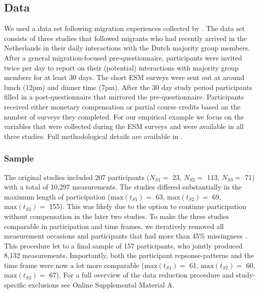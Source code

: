 \subsection{Data}

We used a data set following migration experiences collected by
\citet[][]{Kreienkamp2022b}. The data set consists of three studies that
followed migrants who had recently arrived in the Netherlands in their
daily interactions with the Dutch majority group members. After a
general migration-focused pre-questionnaire, participants were invited
twice per day to report on their (potential) interactions with majority
group members for at least 30 days. The short ESM surveys were sent out
at around lunch (12pm) and dinner time (7pm). After the 30 day study
period participants filled in a post-questionnaire that mirrored the
pre-questionnaire. Participants received either monetary compensation or
partial course credits based on the number of surveys they completed.
For our empirical example we focus on the variables that were collected
during the ESM surveys and were available in all three studies. Full
methodological details are available in \citet[][]{Kreienkamp2022b}.

\subsubsection{Sample}

The original studies included 207 participants (\(N_{S1}=\) 23,
\(N_{S2}=\) 113, \(N_{S3}=\) 71) with a total of 10,297 measurements.
The studies differed substantially in the maximum length of
participation (\(\text{max}(t_{S1})=\) 63, \(\text{max}(t_{S2})=\) 69,
\(\text{max}(t_{S3})=\) 155). This was likely due to the option to
continue participation without compensation in the later two studies. To
make the three studies comparable in participation and time frames, we
iteratively removed all measurement occasions and participants that had
more than 45\% missingness
\citep[which was in line with the general rcecommendation for data that might still need to rely on imputations for later model testing][]{Madley-Dowd2019}.
This procedure let to a final sample of 157 participants, who jointly
produced 8,132 measurements. Importantly, both the participant
repsonse-patterns and the time frame were now a lot more comparable
(\(\text{max}(t_{S1})=\) 61, \(\text{max}(t_{S2})=\) 60,
\(\text{max}(t_{S3})=\) 67). For a full overview of the data reduction
procedure and study-specific exclusions see Online Supplemental Material
A.

